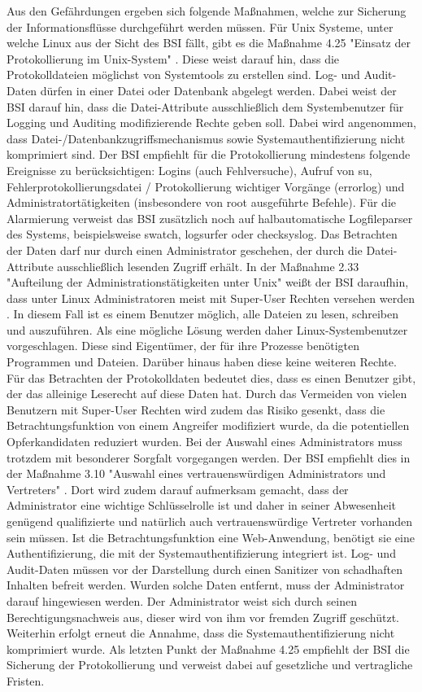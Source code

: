 \documentclass[11pt,a4paper]{report}
\begin{document}
Aus den Gefährdungen ergeben sich folgende Maßnahmen, welche zur Sicherung der Informationsflüsse durchgeführt werden müssen. Für Unix Systeme, unter welche Linux aus der Sicht des BSI fällt, gibt es die Maßnahme 4.25 "Einsatz der Protokollierung im Unix-System" \cite{bsi_m4025}. Diese weist darauf hin, dass die Protokolldateien möglichst von Systemtools zu erstellen sind. Log- und Audit-Daten dürfen in einer Datei oder Datenbank abgelegt werden. Dabei weist der BSI darauf hin, dass die Datei-Attribute ausschließlich dem Systembenutzer für Logging und Auditing modifizierende Rechte geben soll. Dabei wird angenommen, dass Datei-/Datenbankzugriffsmechanismus sowie Systemauthentifizierung nicht komprimiert sind. Der BSI empfiehlt für die Protokollierung mindestens folgende Ereignisse zu berücksichtigen: Logins (auch Fehlversuche), Aufruf von su, Fehlerprotokollierungsdatei / Protokollierung wichtiger Vorgänge (errorlog) und Administratortätigkeiten (insbesondere von root ausgeführte Befehle). Für die Alarmierung verweist das BSI zusätzlich noch auf halbautomatische Logfileparser des Systems, beispielsweise swatch, logsurfer oder checksyslog. Das Betrachten der Daten darf nur durch einen Administrator geschehen, der durch die Datei-Attribute ausschließlich lesenden Zugriff erhält. In der Maßnahme 2.33 "Aufteilung der Administrationstätigkeiten unter Unix" weißt der BSI daraufhin, dass unter Linux Administratoren meist mit Super-User Rechten versehen werden \cite{bsi_m2033}. In diesem Fall ist es einem Benutzer möglich, alle Dateien zu lesen, schreiben und auszuführen. Als eine mögliche Lösung werden daher Linux-Systembenutzer vorgeschlagen. Diese sind Eigentümer, der für ihre Prozesse benötigten Programmen und Dateien. Darüber hinaus haben diese keine weiteren Rechte. Für das Betrachten der Protokolldaten bedeutet dies, dass es einen Benutzer gibt, der das alleinige Leserecht auf diese Daten hat. Durch das Vermeiden von vielen Benutzern mit Super-User Rechten wird zudem das Risiko gesenkt, dass die Betrachtungsfunktion von einem Angreifer modifiziert wurde, da die potentiellen Opferkandidaten reduziert wurden. Bei der Auswahl eines Administrators muss trotzdem mit besonderer Sorgfalt vorgegangen werden. Der BSI empfiehlt dies in der Maßnahme 3.10 "Auswahl eines vertrauenswürdigen Administrators und Vertreters" \cite{bsi_m3010}. Dort wird zudem darauf aufmerksam gemacht, dass der Administrator eine wichtige Schlüsselrolle ist und daher in seiner Abwesenheit genügend qualifizierte und natürlich auch vertrauenswürdige Vertreter vorhanden sein müssen. Ist die Betrachtungsfunktion eine Web-Anwendung, benötigt sie eine Authentifizierung, die mit der Systemauthentifizierung integriert ist. Log- und Audit-Daten müssen vor der Darstellung durch einen Sanitizer von schadhaften Inhalten befreit werden. Wurden solche Daten entfernt, muss der Administrator darauf hingewiesen werden. Der Administrator weist sich durch seinen Berechtigungsnachweis aus, dieser wird von ihm vor fremden Zugriff geschützt. Weiterhin erfolgt erneut die Annahme, dass die Systemauthentifizierung nicht komprimiert wurde. Als letzten Punkt der Maßnahme 4.25 empfiehlt der BSI die Sicherung der Protokollierung und verweist dabei auf gesetzliche und vertragliche Fristen.
\end{document}
